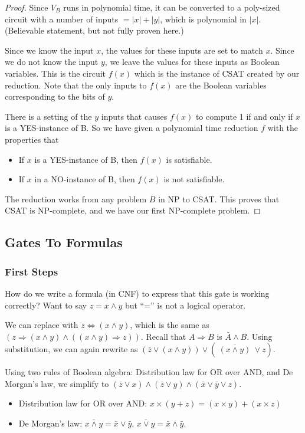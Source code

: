 \begin{proof}
	Since $V_B$ runs in polynomial time, it can be converted to a poly-sized circuit with a number of inputs $= |x| + |y|$, which is polynomial in $|x|$. (Believable statement, but not fully proven here.) 
	
	Since we know the input $x$, the values for these inputs are set to match $x$. Since we do not know the input $y$, we leave the values for these inputs as Boolean variables. This is the circuit $f(x)$ which is the instance of CSAT created by our reduction. Note that the only inputs to $f(x)$ are the Boolean variables corresponding to the bits of $y$.
	
	There is a setting of the $y$ inputs that causes $f(x)$ to compute 1 if and only if $x$ is a YES-instance of B. So we have given a polynomial time reduction $f$ with the properties that 
	\begin{itemize}
		\item If $x$ is a YES-instance of B, then $f(x)$ is satisfiable.
		\item If $x$ in a NO-instance of B, then $f(x)$ is not satisfiable.
	\end{itemize}

	The reduction works from any problem $B$ in NP to CSAT. This proves that CSAT is NP-complete, and we have our first NP-complete problem.
\end{proof}

\subsection{Gates To Formulas}
\subsubsection{First Steps}
How do we write a formula (in CNF) to express that this gate is working correctly? Want to say $z = x \wedge y$ but ``='' is not a logical operator.

We can replace with $z \Leftrightarrow (x \wedge y)$, which is the same as $(z \Rightarrow (x \wedge y) \wedge ((x \wedge y) \Rightarrow z))$. Recall that $A \Rightarrow B$ is $\bar{A} \wedge B$. Using substitution, we can again rewrite as $(\bar{z} \vee (x \wedge y)) \vee (~\overline{(x \wedge y)} ~\vee z)$.

Using two rules of Boolean algebra: Distribution law for OR over AND, and De Morgan's law, we simplify to $(\bar{z} \vee x) \wedge (\bar{z} \vee y) \wedge (\bar{x} \vee \bar{y} \vee z)$.

\begin{itemize}
	\item Distribution law for OR over AND: $x \times (y + z) = (x \times y) + (x \times z)$
	\item De Morgan's law: $\overline{x \wedge y} = \bar{x} \vee \bar{y}$, $\overline{x \vee y} = \bar{x} \wedge \bar{y}$.
\end{itemize}

